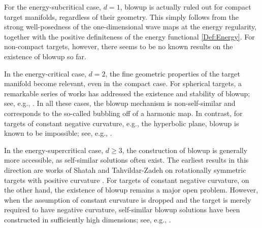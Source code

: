 \documentclass[12pt,reqno]{amsart}
\theoremstyle{plain}
\theoremstyle{remark}
\theoremstyle{plain}
\theoremstyle{definition}
\numberwithin{equation}{section}
\numberwithin{equation}{section}
\begin{document}
	For the energy-subcritical case, $d=1$, blowup is actually ruled out for compact target manifolds, regardless of their geometry. This simply follows  from the strong well-posedness of the one-dimensional wave maps at the energy regularity, together with the positive definiteness of the energy functional \eqref{Def:Energy}. For non-compact targets, however, there seems to be no known results on the existence of blowup so far.
	
	In the energy-critical case, $d=2$, the fine geometric properties of the target manifold become relevant, even in the compact case. For spherical targets, a remarkable series of works has addressed the existence and stability of blowup; see, e.g., \cite{KriSchTat08,RodSte10,RapRod12,KriMia20,KriMiaSch20}. In all these cases, the blowup mechanism is non-self-similar and corresponds to the so-called bubbling off of a harmonic map. In contrast, for targets of constant negative curvature, e.g., the hyperbolic plane, blowup is known to be impossible; see, e.g., \cite{Tao09,SteTat10,SteTat10a,KriSch12}.
	
	In the energy-supercritical case, $d \geq 3$, the construction of blowup is generally more accessible, as self-similar solutions often exist. The earliest results in this direction are works of Shatah and Tahvildar-Zadeh on rotationally symmetric targets with positive curvature \cite{Sha88,ShaTah94}. For targets of constant negative curvature, on the other hand, the existence of blowup remains a major open problem. However, when the assumption of constant curvature is dropped and the target is merely required to have negative curvature, self-similar blowup solutions have been constructed in sufficiently high dimensions; see, e.g., \cite{CazShaTah98,DonGlo19}.
	
\end{document}
